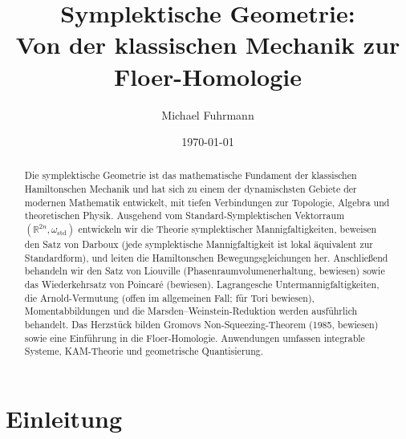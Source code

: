 \documentclass[12pt,a4paper]{amsart}
\theoremstyle{definition}
\begin{document}
\title{Symplektische Geometrie:\\
Von der klassischen Mechanik zur Floer-Homologie}

\author{Michael Fuhrmann}
\address{Specialist Mathematics Project, Build 139}
\date{\today}

\begin{abstract}
Die symplektische Geometrie ist das mathematische Fundament der klassischen
Hamiltonschen Mechanik und hat sich zu einem der dynamischsten Gebiete der
modernen Mathematik entwickelt, mit tiefen Verbindungen zur Topologie, Algebra
und theoretischen Physik.  Ausgehend vom Standard-Symplektischen Vektorraum
$(\mathbb{R}^{2n}, \omega_{\mathrm{std}})$ entwickeln wir die Theorie
symplektischer Mannigfaltigkeiten, beweisen den Satz von Darboux (jede
symplektische Mannigfaltigkeit ist lokal äquivalent zur Standardform), und
leiten die Hamiltonschen Bewegungsgleichungen her.  Anschließend behandeln wir
den Satz von Liouville (Phasenraumvolumenerhaltung, bewiesen) sowie das
Wiederkehrsatz von Poincar\'{e} (bewiesen).  Lagrangesche Untermannigfaltig\-keiten,
die Arnold-Vermutung (offen im allgemeinen Fall; für Tori bewiesen),
Momentabbildungen und die Marsden--Weinstein-Reduktion werden ausführlich
behandelt.  Das Herzstück bilden Gromovs Non-Squeezing-Theorem (1985, bewiesen)
sowie eine Einführung in die Floer-Homologie.  Anwendungen umfassen integrable
Systeme, KAM-Theorie und geometrische Quantisierung.
\end{abstract}

\maketitle

\tableofcontents

\section{Einleitung}
\end{document}
